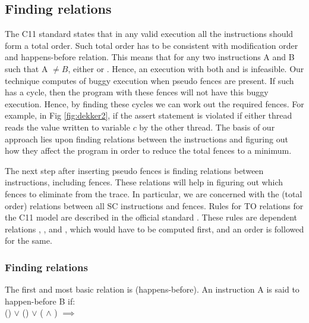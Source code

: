 \subsection{Finding relations}
The C11 standard \cite{C11} states that in any valid execution 
all the \mosc instructions should form a total order. Such total order
has to be consistent with modification order and 
happens-before relation. This means that for any two \mosc instructions A 
and B such that A $ \neq B $, either  or . 
Hence, an execution with both  and  is infeasible.
Our technique computes \setTO of buggy execution when pseudo fences are 
present. If such \setTO has a cycle, then the program with these fences 
will not have this buggy execution. 
Hence, by finding these cycles we can work out the required fences.
For example, in Fig \ref{fig:dekker2}, if the assert statement is violated
if either thread reads the value written to variable $c$ by the other thread.
The basis of our approach lies upon finding relations between the 
instructions and figuring out how they affect the program in order to 
reduce the total fences to a minimum. 

\par
The next step after inserting pseudo fences is finding relations between 
instructions, including fences. 
These relations will help in figuring out which fences to eliminate from 
the trace. In particular, we are concerned with the \setTO (total order) 
relations between all SC instructions and fences. Rules for TO relations 
for the C11 model are described in the official standard \cite{C11}. 
These rules are dependent relations \setSB, \setSW, \setHB and \setMO, which 
would have to be computed first, and an order is followed for the same.

\subsubsection{Finding \setHB relations}
The first and most basic relation is \setHB (happens-before). 
An instruction A is said to happen-before B if:\\
() $\lor$ () $\lor$ ( $\land$ ) $\implies$ 

